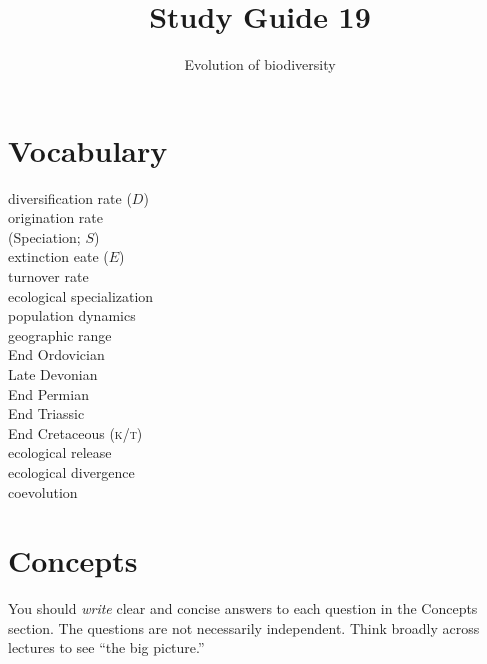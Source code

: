 \documentclass[letterpaper]{tufte-handout}
\title{Study Guide 19\hfill}
\author{Evolution of biodiversity}
\date{} %
\begin{document}
\maketitle	%

\section{Vocabulary}

\begin{multicols}{2}
diversification rate ($D$)\\
origination rate\\\hspace{1em}(Speciation; $S$)\\
extinction eate ($E$)\\
turnover rate\\
ecological specialization \\
population dynamics \\
geographic range \\
End Ordovician\\
Late Devonian\\
End Permian\\
End Triassic\\
End Cretaceous \textsc{(k/t)} \\
ecological release\\
ecological divergence\\
coevolution \\

\end{multicols}


\section{Concepts}

You should \emph{write} clear and concise answers to each question in the Concepts section.  The questions are not necessarily independent.  Think broadly across lectures to see ``the big picture.'' 
\end{document}
